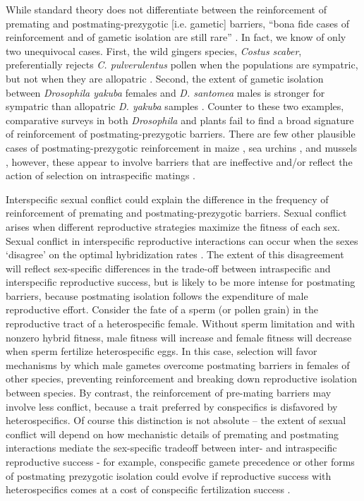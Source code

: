 \documentclass[11pt]{article}
\begin{document}
While standard theory does not differentiate between the reinforcement of premating  and postmating-prezygotic [i.e. gametic] barriers, ``bona fide cases of reinforcement and of gametic isolation are still rare'' \citep{turissini2018}. %
In fact, we know of only two unequivocal cases. 
First, the wild gingers species,  \textit{Costus scaber}, preferentially rejects  \textit{C. pulverulentus} pollen when the populations are sympatric, but not when they are allopatric \citep{kay2008}.  %
Second, the extent of gametic isolation between \textit{Drosophila yakuba} females and \textit{D. santomea} males is stronger for sympatric than allopatric \textit{D. yakuba} samples \citep{matute2010}. 
Counter to these two examples, comparative surveys in both \textit{Drosophila} \citep{turissini2018} and plants \citep{moyle2004} fail to find a broad signature of reinforcement of postmating-prezygotic barriers. 
There are few other plausible cases of postmating-prezygotic reinforcement in maize \citep{kermicle2006}, sea urchins \citep{lessios2007,geyer2003,zigler2003}, and mussels \citep{slaughter2008}, however, these appear to involve barriers that are ineffective \citep{slaughter2008} and/or reflect the action of selection on intraspecific matings \citep{geyer2009}. 

Interspecific sexual conflict could explain the difference in the frequency of reinforcement of premating and postmating-prezygotic barriers.   
Sexual conflict arises when different reproductive strategies maximize the fitness of each sex.    
Sexual conflict in interspecific reproductive interactions can occur when the sexes `disagree' on the optimal hybridization rates \citep{parker1998}.  
The extent of this disagreement will reflect sex-specific differences in the trade-off between intraspecific and interspecific reproductive success, but is likely to be more intense for postmating barriers, because postmating isolation follows the expenditure of male reproductive effort.
Consider the fate of a sperm (or pollen grain) in the reproductive tract of a heterospecific female. 
Without sperm limitation and with nonzero hybrid fitness, male fitness will increase and female fitness will decrease when sperm fertilize heterospecific eggs.   
In this case, selection will favor mechanisms by which male gametes overcome postmating barriers in females of other species, preventing reinforcement and breaking down reproductive isolation between species.   
By contrast, the reinforcement of pre-mating barriers may involve less conflict, because a trait preferred by conspecifics is disfavored by heterospecifics.   
Of course this distinction is not absolute --  the extent of sexual conflict will depend on how mechanistic details of premating and postmating interactions mediate the  sex-specific tradeoff between inter- and intraspecific reproductive success - for example, conspecific gamete precedence or other forms of postmating prezygotic isolation could evolve if reproductive success with heterospecifics comes at a cost of conspecific fertilization success . 
\end{document}
